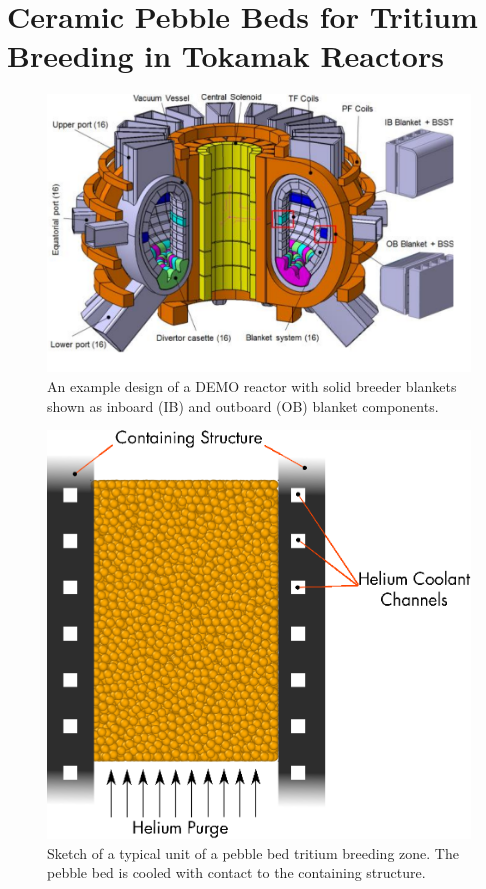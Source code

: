 \section{Ceramic Pebble Beds for Tritium Breeding in Tokamak Reactors}
\begin{figure}[ht]
	\centering

	\includegraphics[width=\singleimagewidth]{figures/demo} 
	\caption{An example design of a DEMO reactor with solid breeder blankets shown as inboard (IB) and outboard (OB) blanket components.}
	\label{fig:demo}
\end{figure}

\begin{figure}[ht]
	\centering
	\includegraphics[width=\singleimagewidth]{figures/solid_breeder_sketch} 
	\caption{Sketch of a typical unit of a pebble bed tritium breeding zone. The pebble bed is cooled with contact to the containing structure.}
	\label{fig:solid-breeder-sketch}
\end{figure}

